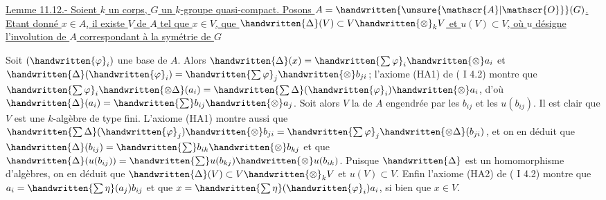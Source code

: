

\uline{Lemme 11.12.- Soient $k$ un corps, $G$ un $k$-groupe quasi-compact. Posons $A=\handwritten{\unsure{\mathscr{A}|\mathscr{O}}}(G)$. Etant donné $x\in A$, il existe  $V$ de $A$ tel que $x\in V$, que $\handwritten{\Delta}(V)\subset V\handwritten{\otimes}_k V$ et $u(V)\subset V$, où $u$ désigne l'involution de $A$ correspondant à la symétrie de $G$}


Soit $(\handwritten{\varphi}_i)$ une base de $A$. Alors $\handwritten{\Delta}(x)=\handwritten{\sum\varphi}_i\handwritten{\otimes}a_i$ et $\handwritten{\Delta}(\handwritten{\varphi}_i)=\handwritten{\sum\varphi}_j\handwritten{\otimes}b_{ji}$; l'axiome (HA1) de ( I 4.2) montre que $\handwritten{\sum\varphi}_i\handwritten{\otimes\Delta}(a_i)=\handwritten{\sum\Delta}(\handwritten{\varphi}_i)\handwritten{\otimes}a_i$, d'où $\handwritten{\Delta}(a_i)=\handwritten{\sum}b_{ij}\handwritten{\otimes}a_j$. Soit alors $V$ la  de $A$ engendrée par les $b_{ij}$ et les $u(b_{ij})$. Il est clair que $V$ est une $k$-algèbre de type fini. L'axiome (HA1) montre aussi que $\handwritten{\sum\Delta}(\handwritten{\varphi}_j)\handwritten{\otimes}b_{ji}=\handwritten{\sum\varphi}_j\handwritten{\otimes\Delta}(b_{ji})$, et on en déduit que $\handwritten{\Delta}(b_{ij})=\handwritten{\sum}b_{ik}\handwritten{\otimes}b_{kj}$ et que $\handwritten{\Delta}(u(b_{ij}))=\handwritten{\sum}u(b_{kj})\handwritten{\otimes}u(b_{ik})$. Puisque $\handwritten{\Delta}$ est un homomorphisme d'algèbres, on en déduit que $\handwritten{\Delta}(V)\subset V\handwritten{\otimes}_k V$ et $u(V)\subset V$. Enfin l'axiome (HA2) de ( I 4.2) montre que $a_i=\handwritten{\sum\eta}(a_j)b_{ij}$ et que $x=\handwritten{\sum\eta}(\handwritten{\varphi}_i)a_i$, si bien que $x\in V$.

